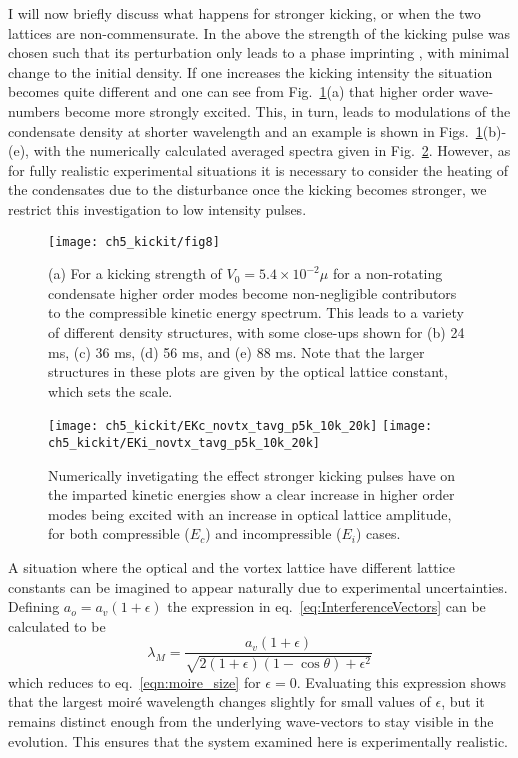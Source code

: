     I will now briefly discuss what happens for stronger kicking, or when the two lattices are non-commensurate. In the above the strength of the kicking pulse was chosen such that its perturbation only leads to a phase imprinting \cite{Vtx:Dobrek_pra_1999,BEC:Denschlag_sci_2000}, with minimal change to the initial density. If one increases the kicking intensity the situation becomes quite different and one can see from Fig.~\ref{fig:kickp20k}(a) that higher order wave-numbers become more strongly excited. This, in turn, leads to modulations of the condensate density at shorter wavelength and an example is shown in Figs.~\ref{fig:kickp20k}(b)-(e), with the numerically calculated averaged spectra given in Fig.~\ref{fig:kick_compare_spec}. However, as for fully realistic experimental situations it is necessary to consider the heating of the condensates due to the disturbance once the kicking becomes stronger, we restrict this investigation to low intensity pulses.

\begin{figure}[tb]
    \centering
	\texttt{[image: ch5\_kickit/fig8]}
	\caption[Higher order modes induced by stronger kicking.]{(a) For a kicking strength of $V_0 = 5.4\times10^{-2}\mu$ for a non-rotating condensate higher order modes become non-negligible contributors to the compressible kinetic energy spectrum. This leads to a variety of different density structures, with some close-ups shown for (b) 24 ms, (c) 36 ms, (d) 56 ms, and (e) 88 ms. Note that the larger structures in these plots are given by the optical lattice constant, which sets the scale.}
	\label{fig:kickp20k}
\end{figure}
\begin{figure}[tb]
    \centering
    \texttt{[image: ch5\_kickit/EKc\_novtx\_tavg\_p5k\_10k\_20k]}
    \texttt{[image: ch5\_kickit/EKi\_novtx\_tavg\_p5k\_10k\_20k]}
	\caption[Comparison of kinetic energy spectra for increased kicking strengths.]{Numerically invetigating the effect stronger kicking pulses have on the imparted kinetic energies show a clear increase in higher order modes being excited with an increase in optical lattice amplitude, for both compressible ($E_c$) and incompressible ($E_i$) cases.}\label{fig:kick_compare_spec}
\end{figure}

    A situation where the optical and the vortex lattice have different lattice constants can be imagined to appear naturally due to experimental uncertainties. Defining $a_o = a_v(1+\epsilon)$ the expression in eq.~\eqref{eq:InterferenceVectors} can be calculated to be
    \begin{equation}
    	\lambda_M = \frac{a_v(1+\epsilon)}{\sqrt{2(1+\epsilon)(1-\cos\theta) + \epsilon^2}}
    	\label{eqn:moire_size_eps}
    \end{equation}
    which reduces to eq.~\eqref{eqn:moire_size} for $\epsilon=0$. Evaluating this expression shows that the largest moir\'e wavelength changes slightly for small values of $\epsilon$, but it remains distinct enough from the underlying wave-vectors to stay visible in the evolution. This ensures that the system examined here is experimentally realistic.

